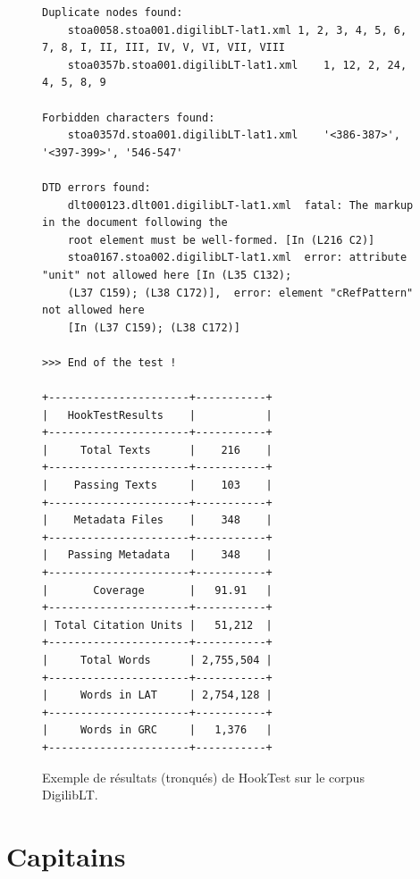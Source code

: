 \begin{figure}
\begin{adjustbox}{width=.9\linewidth}
\begin{lstlisting}[breaklines=false,columns=fullflexible,keepspaces]
Duplicate nodes found:
	stoa0058.stoa001.digilibLT-lat1.xml	1, 2, 3, 4, 5, 6, 7, 8, I, II, III, IV, V, VI, VII, VIII
	stoa0357b.stoa001.digilibLT-lat1.xml	1, 12, 2, 24, 4, 5, 8, 9

Forbidden characters found:
	stoa0357d.stoa001.digilibLT-lat1.xml	'<386-387>', '<397-399>', '546-547'

DTD errors found:
	dlt000123.dlt001.digilibLT-lat1.xml	 fatal: The markup in the document following the 
	root element must be well-formed. [In (L216 C2)]
	stoa0167.stoa002.digilibLT-lat1.xml	 error: attribute "unit" not allowed here [In (L35 C132); 
	(L37 C159); (L38 C172)],  error: element "cRefPattern" not allowed here 
	[In (L37 C159); (L38 C172)]

>>> End of the test !

+----------------------+-----------+
|   HookTestResults    |           |
+----------------------+-----------+
|     Total Texts      |    216    |
+----------------------+-----------+
|    Passing Texts     |    103    |
+----------------------+-----------+
|    Metadata Files    |    348    |
+----------------------+-----------+
|   Passing Metadata   |    348    |
+----------------------+-----------+
|       Coverage       |   91.91   |
+----------------------+-----------+
| Total Citation Units |   51,212  |
+----------------------+-----------+
|     Total Words      | 2,755,504 |
+----------------------+-----------+
|     Words in LAT     | 2,754,128 |
+----------------------+-----------+
|     Words in GRC     |   1,376   |
+----------------------+-----------+
\end{lstlisting}
\end{adjustbox}
\caption{Exemple de résultats (tronqués) de HookTest sur le corpus DigilibLT.}
\label{fig:annx:digiliblt-hooktest}
\end{figure}

\section*{Capitains}

